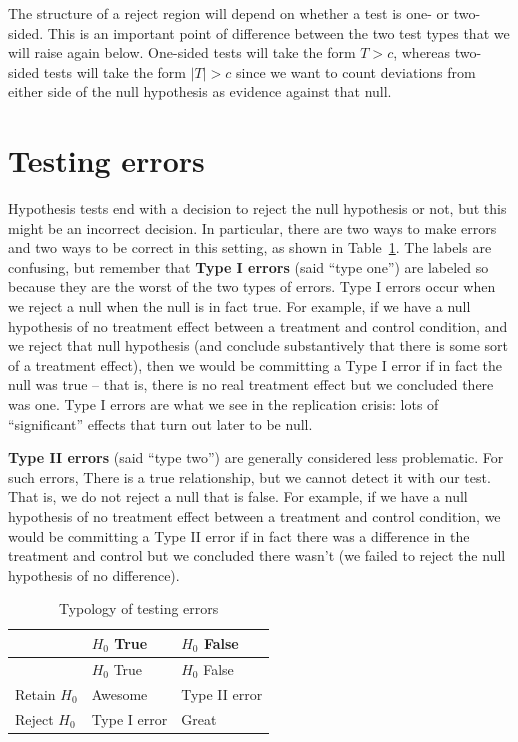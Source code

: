 \documentclass[
  letterpaper,
  DIV=11,
  numbers=noendperiod]{scrreprt}
\theoremstyle{definition}
\theoremstyle{definition}
\theoremstyle{plain}
\theoremstyle{remark}
\begin{document}
The structure of a reject region will depend on whether a test is one-
or two-sided. This is an important point of difference between the two
test types that we will raise again below. One-sided tests will take the
form \(T > c\), whereas two-sided tests will take the form \(|T| > c\)
since we want to count deviations from either side of the null
hypothesis as evidence against that null.

\hypertarget{testing-errors}{%
\section{Testing errors}\label{testing-errors}}

Hypothesis tests end with a decision to reject the null hypothesis or
not, but this might be an incorrect decision. In particular, there are
two ways to make errors and two ways to be correct in this setting, as
shown in Table~\ref{tbl-errors}. The labels are confusing, but remember
that \textbf{Type I errors} (said ``type one'') are labeled so because
they are the worst of the two types of errors. Type I errors occur when
we reject a null when the null is in fact true. For example, if we have
a null hypothesis of no treatment effect between a treatment and control
condition, and we reject that null hypothesis (and conclude
substantively that there is some sort of a treatment effect), then we
would be committing a Type I error if in fact the null was true -- that
is, there is no real treatment effect but we concluded there was one.
Type I errors are what we see in the replication crisis: lots of
``significant'' effects that turn out later to be null.

\textbf{Type II errors} (said ``type two'') are generally considered
less problematic. For such errors, There is a true relationship, but we
cannot detect it with our test. That is, we do not reject a null that is
false. For example, if we have a null hypothesis of no treatment effect
between a treatment and control condition, we would be committing a Type
II error if in fact there was a difference in the treatment and control
but we concluded there wasn't (we failed to reject the null hypothesis
of no difference).

\hypertarget{tbl-errors}{}
\begin{longtable}[]{@{}lll@{}}
\caption{\label{tbl-errors}Typology of testing errors}\tabularnewline
\toprule\noalign{}
& \(H_0\) True & \(H_0\) False \\
\midrule\noalign{}
\endfirsthead
\toprule\noalign{}
& \(H_0\) True & \(H_0\) False \\
\midrule\noalign{}
\endhead
\bottomrule\noalign{}
\endlastfoot
Retain \(H_0\) & Awesome & Type II error \\
Reject \(H_0\) & Type I error & Great \\
\end{longtable}
\end{document}
